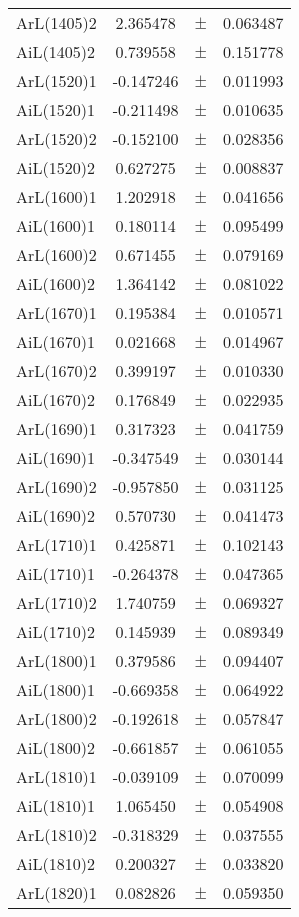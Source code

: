 \begin{table}
\begin{tiny}
\begin{tabular}{lccc}
ArL(1405)2 & 2.365478 & $\pm$ & 0.063487 \\
AiL(1405)2 & 0.739558 & $\pm$ & 0.151778 \\
ArL(1520)1 & -0.147246 & $\pm$ & 0.011993 \\
AiL(1520)1 & -0.211498 & $\pm$ & 0.010635 \\
ArL(1520)2 & -0.152100 & $\pm$ & 0.028356 \\
AiL(1520)2 & 0.627275 & $\pm$ & 0.008837 \\
ArL(1600)1 & 1.202918 & $\pm$ & 0.041656 \\
AiL(1600)1 & 0.180114 & $\pm$ & 0.095499 \\
ArL(1600)2 & 0.671455 & $\pm$ & 0.079169 \\
AiL(1600)2 & 1.364142 & $\pm$ & 0.081022 \\
ArL(1670)1 & 0.195384 & $\pm$ & 0.010571 \\
AiL(1670)1 & 0.021668 & $\pm$ & 0.014967 \\
ArL(1670)2 & 0.399197 & $\pm$ & 0.010330 \\
AiL(1670)2 & 0.176849 & $\pm$ & 0.022935 \\
ArL(1690)1 & 0.317323 & $\pm$ & 0.041759 \\
AiL(1690)1 & -0.347549 & $\pm$ & 0.030144 \\
ArL(1690)2 & -0.957850 & $\pm$ & 0.031125 \\
AiL(1690)2 & 0.570730 & $\pm$ & 0.041473 \\
ArL(1710)1 & 0.425871 & $\pm$ & 0.102143 \\
AiL(1710)1 & -0.264378 & $\pm$ & 0.047365 \\
ArL(1710)2 & 1.740759 & $\pm$ & 0.069327 \\
AiL(1710)2 & 0.145939 & $\pm$ & 0.089349 \\
ArL(1800)1 & 0.379586 & $\pm$ & 0.094407 \\
AiL(1800)1 & -0.669358 & $\pm$ & 0.064922 \\
ArL(1800)2 & -0.192618 & $\pm$ & 0.057847 \\
AiL(1800)2 & -0.661857 & $\pm$ & 0.061055 \\
ArL(1810)1 & -0.039109 & $\pm$ & 0.070099 \\
AiL(1810)1 & 1.065450 & $\pm$ & 0.054908 \\
ArL(1810)2 & -0.318329 & $\pm$ & 0.037555 \\
AiL(1810)2 & 0.200327 & $\pm$ & 0.033820 \\
ArL(1820)1 & 0.082826 & $\pm$ & 0.059350 \\

\end{tabular}
\end{tiny}
\end{table}
